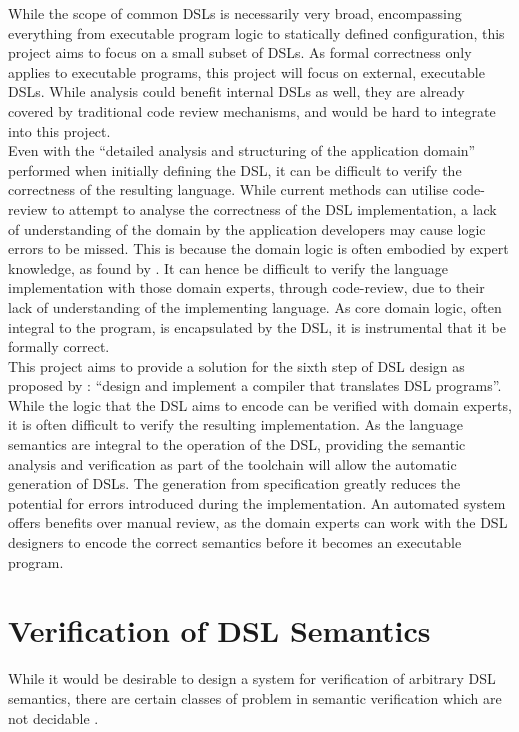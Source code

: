 While the scope of common DSLs is necessarily very broad, encompassing everything from executable program logic to statically defined configuration, this project aims to focus on a small subset of DSLs.
As formal correctness only applies to executable programs, this project will focus on external, executable DSLs. 
While analysis could benefit internal DSLs as well, they are already covered by traditional code review mechanisms, and would be hard to integrate into this project.\\

Even with the ``detailed analysis and structuring of the application domain'' \citep{van2000domain} performed when initially defining the DSL, it can be difficult to verify the correctness of the resulting language. 
While current methods can utilise code-review to attempt to analyse the correctness of the DSL implementation, a lack of understanding of the domain by the application developers may cause logic errors to be missed. 
This is because the domain logic is often embodied by expert knowledge, as found by \cite{studer1998knowledge}. 
It can hence be difficult to verify the language implementation with those domain experts, through code-review, due to their lack of understanding of the implementing language.
As core domain logic, often integral to the program, is encapsulated by the DSL, it is instrumental that it be formally correct.\\

This project aims to provide a solution for the sixth step of DSL design as proposed by \cite{van2000domain}: ``design and implement a compiler that translates DSL programs''. 
While the logic that the DSL aims to encode can be verified with domain experts, it is often difficult to verify the resulting implementation.
As the language semantics are integral to the operation of the DSL, providing the semantic analysis and verification as part of the toolchain will allow the automatic generation of DSLs.
The generation from specification greatly reduces the potential for errors introduced during the implementation.
An automated system offers benefits over manual review, as the domain experts can work with the DSL designers to encode the correct semantics before it becomes an executable program.


\section{Verification of DSL Semantics} %
\label{sec:verification_of_dsl_semantics}
While it would be desirable to design a system for verification of arbitrary DSL semantics, there are certain classes of problem in semantic verification which are not decidable \citep{abdulla1994undecidable}. \\

